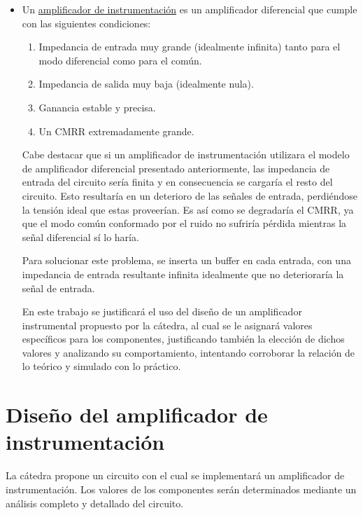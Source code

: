 \documentclass[../../tc_tp3_main.tex]{subfiles}
\begin{document}
\begin{itemize}
	\item Un \underline{amplificador de instrumentación} es un amplificador diferencial que cumple con las siguientes condiciones: \par
	
	\begin{enumerate}
		\item Impedancia de entrada muy grande (idealmente infinita) tanto para el modo diferencial como para el común.
		\item Impedancia de salida muy baja (idealmente nula).
		\item Ganancia estable y precisa.
		\item Un CMRR extremadamente grande.
	\end{enumerate}
	Cabe destacar que si un amplificador de instrumentación utilizara el modelo de amplificador diferencial presentado anteriormente, las impedancia de entrada del circuito sería finita y en consecuencia se cargaría el resto del circuito. Esto resultaría en un deterioro  de las señales de entrada, perdiéndose la tensión ideal que estas proveerían. Es así como se degradaría el CMRR, ya que el modo común conformado por el ruido no sufriría pérdida mientras la señal diferencial sí lo haría.\par
	Para solucionar este problema, se inserta un buffer en cada entrada, con una impedancia de entrada resultante infinita idealmente que no deterioraría la señal de entrada.\par
	
	En este trabajo se justificará el uso del diseño de un amplificador instrumental propuesto por la cátedra, al cual se le asignará valores específicos para los componentes, justificando también la elección de dichos valores y analizando su comportamiento, intentando corroborar la relación de lo teórico y simulado con lo práctico.\par

	\end{itemize}
	
\section{Diseño del amplificador de instrumentación}

La cátedra propone un circuito con el cual se implementará un amplificador de instrumentación. Los valores de los componentes serán determinados mediante un análisis completo y detallado del circuito. 
\end{document}

